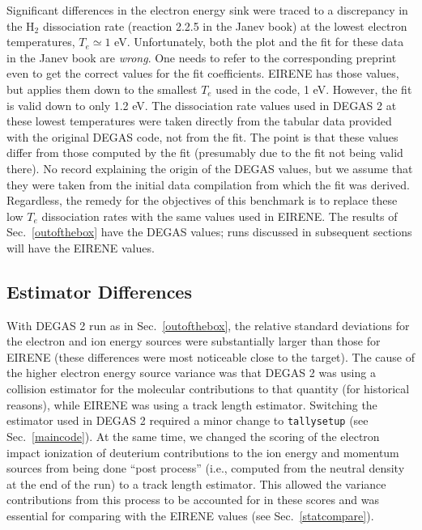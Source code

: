\documentclass[12pt]{report}
\begin{document}
Significant differences in the electron energy sink were traced to
a discrepancy in the H$_{2}$ dissociation rate (reaction 2.2.5
in the Janev book\cite{Jane87}) at the lowest electron temperatures,
$T_{e} \simeq 1$ eV. Unfortunately, both the plot and the fit 
for these data in the Janev book are {\em wrong}. One needs
to refer to the corresponding preprint even to get the correct
values for the fit coefficients. EIRENE has those values, but applies
them down to the smallest $T_{e}$ used in the code, 1 eV. However,
the fit is valid down to only 1.2 eV. The dissociation rate values
used in DEGAS 2 at these lowest temperatures were taken directly from
the tabular data provided with the original DEGAS code\cite{Heif82},
not from the fit. The point is that these values differ from those
computed by the fit (presumably due to the fit not being valid there).
No record explaining the origin of the DEGAS values, but we assume
that they were taken from the initial data compilation from which the
fit was derived. Regardless, the remedy for the objectives of this
benchmark is to replace these low $T_{e}$ dissociation rates with the
same values used in EIRENE. The results of Sec.~\ref{outofthebox}
have the DEGAS values; runs discussed in subsequent sections will
have the EIRENE values.

\subsection{Estimator Differences}
\label{estdiffs}

With DEGAS 2 run as in Sec.~\ref{outofthebox}, the relative standard
deviations for the electron and ion energy sources were substantially
larger than those for EIRENE (these differences were most noticeable
close to the target). The cause of the higher electron energy
source variance was that DEGAS 2 was using a collision estimator
for the molecular contributions to that quantity (for historical reasons), 
while EIRENE was using a track length estimator. Switching the estimator
used in DEGAS 2 required a minor change to {\tt tallysetup} (see
Sec.~\ref{maincode}). At the same time, we changed the scoring of
the electron impact ionization of deuterium contributions to the ion
energy and momentum sources from being done ``post process''
(i.e., computed from the neutral density at the end of the run) to
a track length estimator. This allowed the variance contributions from
this process to be accounted for in these scores and was essential for
comparing with the EIRENE values (see Sec.~\ref{statcompare}).
\end{document}
